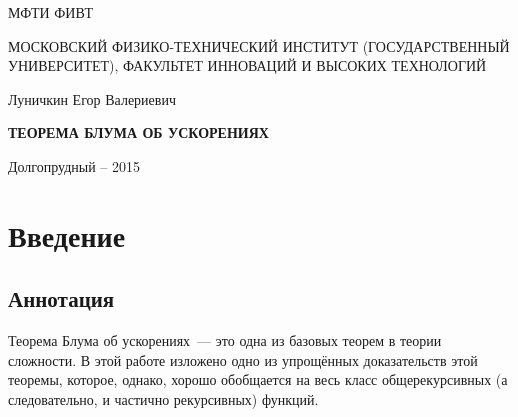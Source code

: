 \documentclass[a4paper,12pt]{report}
\begin{document}

\thispagestyle{empty}

\begin{center}
\MakeUppercase{МФТИ ФИВТ} \par
\MakeUppercase{Московский физико-технический институт (государственный университет), факультет инноваций и высоких технологий} \par 
\par
\end{center}

\vspace{50mm}

\begin{center}
{\large Луничкин Егор Валериевич}
\end{center}

\vspace{5mm}
\begin{center}
{\bf \large \MakeUppercase{Теорема Блума об ускорениях}
\par}

\vspace{20mm}

\end{center}

\vspace{100mm}


\begin{center}
{Долгопрудный -- 2015}
\end{center}

\tableofcontents
\clearpage

\chapter{Введение}
\section{Аннотация}
Теорема Блума об ускорениях~--- это одна из базовых теорем в теории сложности. В этой работе изложено одно из упрощённых доказательств этой теоремы, которое, однако, хорошо обобщается на весь класс общерекурсивных (а следовательно, и частично рекурсивных) функций. 
\end{document}
